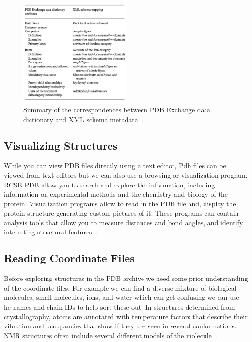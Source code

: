 \documentclass{report}
\begin{document}
\begin{figure}[H]
    \centering
    \includegraphics[width=0.5\textwidth]{xml.png}
    \caption{\label{fig:xml}Summary of the correspondences between PDB Exchange data dictionary and XML schema metadata~\cite{westbrook_pdbml_2005}.}
\end{figure}


\subsection{Visualizing Structures}

While you can view PDB files directly using a text editor,
Pdb files can be viewed from text editors but we can also use a browsing or visualization program. RCSB PDB allow you to search and explore the information, including information on experimental methods and the chemistry and biology of the protein. Visualization programs allow to read in the PDB file and, display the protein structure generating custom pictures of it. These programs can contain analysis tools that allow you to measure distances and bond angles, and identify interesting structural features~\cite{noauthor_pdb101_nodate}.

\subsection{Reading Coordinate Files}

Before exploring structures in the PDB archive we need some prior understanding of the coordinate files. For example we can find a diverse mixture of biological molecules, small molecules, ions, and water which can get confusing we can use he names and chain IDs to help sort these out. In structures determined from crystallography, atoms are annotated with temperature factors that describe their vibration and occupancies that show if they are seen in several conformations. NMR structures often include several different models of the molecule~\cite{noauthor_pdb101_nodate}.
\end{document}
